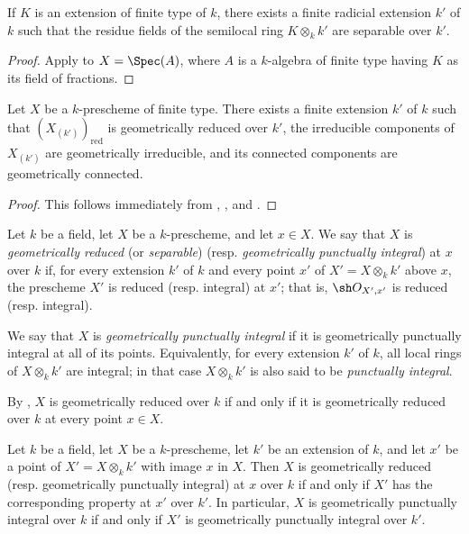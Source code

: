 \begin{corollary}[4.6.7]
\label{IV.4.6.7}
If $K$ is an extension of finite type of $k$, there exists a finite
radicial extension $k'$ of $k$ such that the residue fields of the
semilocal ring $K\otimes_k k'$ are separable over $k'$.
\end{corollary}

\begin{proof}
Apply  to $X=\Spec(A)$, where $A$ is a $k$-algebra of
finite type having $K$ as its field of fractions.
\end{proof}

\begin{corollary}[4.6.8]
\label{IV.4.6.8}
Let $X$ be a $k$-prescheme of finite type.
There exists a finite extension $k'$ of $k$ such that
$(X_{(k')})_{\mathrm{red}}$ is geometrically reduced over $k'$, the
irreducible components of $X_{(k')}$ are geometrically irreducible,
and its connected components are geometrically connected.
\end{corollary}

\begin{proof}
This follows immediately from ,
, and .
\end{proof}

\begin{definition}[4.6.9]
\label{IV.4.6.9}
Let $k$ be a field, let $X$ be a $k$-prescheme, and let $x\in X$.
We say that $X$ is \emph{geometrically reduced}
(or \emph{separable}) \textup{(resp.} \emph{geometrically punctually
integral}) at $x$ over $k$ if, for every extension $k'$ of $k$ and
every point $x'$ of $X'=X\otimes_k k'$ above $x$, the prescheme $X'$
is reduced \textup{(resp.} integral) at $x'$; that is,
$\sh O_{X',x'}$ is reduced \textup{(resp.} integral).

We say that $X$ is \emph{geometrically punctually integral} if it is
geometrically punctually integral at all of its points.
Equivalently, for every extension $k'$ of $k$, all local rings of
$X\otimes_k k'$ are integral; in that case $X\otimes_k k'$ is also
said to be \emph{punctually integral}.
\end{definition}

By , $X$ is geometrically reduced over $k$ if and only
if it is geometrically reduced over $k$ at every point $x\in X$.

\begin{proposition}[4.6.10]
\label{IV.4.6.10}
Let $k$ be a field, let $X$ be a $k$-prescheme, let $k'$ be an
extension of $k$, and let $x'$ be a point of
$X'=X\otimes_k k'$ with image $x$ in $X$.
Then $X$ is geometrically reduced
\textup{(resp.} geometrically punctually integral) at $x$ over $k$ if and only
if $X'$ has the corresponding property at $x'$ over $k'$.
In particular, $X$ is geometrically punctually integral over $k$ if
and only if $X'$ is geometrically punctually integral over $k'$.
\end{proposition}

